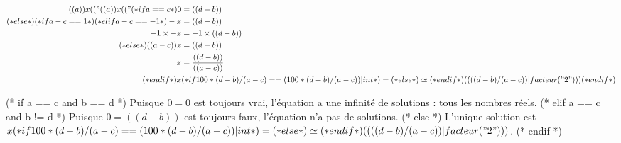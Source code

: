 \exercice*

\begin{align*}
  (( a )) x (( "%
  (( a )) x (( "%
  (* if a == c *)
    0 &= (( d - b )) \\
  (* else *)
    (* if a - c == 1 *)
    (* elif a - c == -1 *)
      -x &= (( d - b )) \\
      -1 \times -x &= -1 \times (( d - b )) \\
    (* else *)
      (( a - c )) x &= (( d - b )) \\
      x &= \frac{(( d - b ))}{(( a - c ))} \\
    (* endif *)
    x &
         (* if 100*(d-b)/(a-c) == (100*(d-b)/(a-c))|int *)
             =
         (* else *)
             \simeq
         (* endif *)
         (( ((d-b)/(a-c)) | facteur("2") ))
  (* endif *)
\end{align*}

(* if a == c and b == d *)
  Puisque $0=0$ est toujours vrai, l'équation a une infinité de solutions : tous les nombres réels.
(* elif a == c and b != d *)
  Puisque $0=((d - b))$ est toujours faux, l'équation n'a pas de solutions.
(* else *)
  L'unique solution est
  $x
  (* if 100*(d-b)/(a-c) == (100*(d-b)/(a-c))|int *)
      =
  (* else *)
      \simeq
  (* endif *)
  (( ((d-b)/(a-c)) | facteur("2") ))$.
(* endif *)
